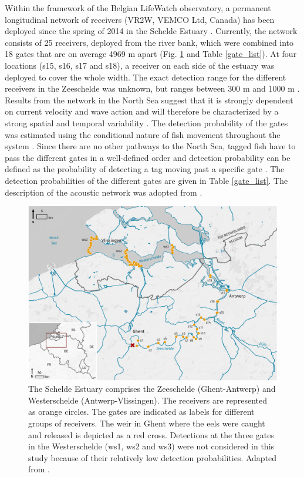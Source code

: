 \documentclass[preprint,12pt,authoryear]{elsarticle}
\begin{document}
Within the framework of the Belgian LifeWatch observatory, a permanent longitudinal network of receivers (VR2W, VEMCO Ltd, Canada) has been deployed since the spring of 2014 in the Schelde Estuary \citep{Reubens2019TheNetwork}. Currently, the network consists of 25 receivers, deployed from the river bank, which were combined into 18 gates that are on average 4969 m apart (Fig. \ref{fig:network} and Table \ref{gate_list}). At four locations (s15, s16, s17 and s18), a receiver on each side of the estuary was deployed to cover the whole width. The exact detection range for the different receivers in the Zeeschelde was unknown, but ranges between 300 m and 1000 m \citep{Verhelst2018}. Results from the network in the North Sea suggest that it is strongly dependent on current velocity and wave action and will therefore be characterized by a strong spatial and temporal variability \citep{Reubens2018}. The detection probability of the gates was estimated using the conditional nature of fish movement throughout the system \citep{Brownscombe2019ConductingManagers}. Since there are no other pathways to the North Sea, tagged fish have to pass the different gates in a well-defined order and detection probability can be defined as the probability of detecting a tag moving past a specific gate \citep{Melnychuk2012,Perry2012UsingData}. The detection probabilities of the different gates are given in Table \ref{gate_list}. The description of the acoustic network was adopted from \cite{Bruneel2020QuantifyingSystems}. 

\begin{figure}[h!]
  \centering\includegraphics[scale=0.6]{receivernetwork-mechelen.pdf}
  \caption{The Schelde Estuary comprises the Zeeschelde (Ghent-Antwerp) and Westerschelde (Antwerp-Vlissingen). The receivers are represented as orange circles. The gates are indicated as labels for different groups of receivers. The weir in Ghent where the eels were caught and released is depicted as a red cross. Detections at the three gates in the Westerschelde (ws1, ws2 and ws3) were not considered in this study because of their relatively low detection probabilities. Adapted from \cite{Bruneel2020QuantifyingSystems}.}
  \label{fig:network}
\end{figure}
\end{document}
